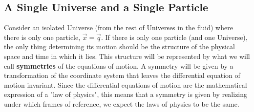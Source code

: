 \documentclass[11pt, a4paper]{article} %
\begin{document}
\subsection*{A Single Universe and a Single Particle}
Consider an isolated Universe (from the rest of Universes in the fluid) where there is only one particle, $\vec{x}=\vec{q}$. If there is only one particle (and one Universe), the only thing determining its motion should be the structure of the physical space and time in which it lies. This structure will be represented by what we will call {\bf symmetries} of the equations of motion. A symmetry will be given by a transformation of the coordinate system that leaves the differential equation of motion invariant. Since the differential equations of motion are the mathematical expression of a "law of physics", this means that a symmetry is given by realizing under which frames of reference, we expect the laws of physics to be the same.
\end{document}
